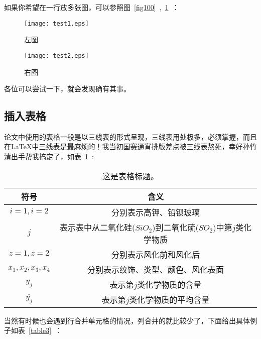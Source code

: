 如果你希望在一行放多张图，可以参照图~\ref{fig100}~,~\ref{fig101}~：
\begin{figure}[H]
	\centering
	\begin{minipage}[t]{0.48\textwidth}
		\centering
		\texttt{[image: test1.eps]}
		\caption{左图}
		\label{fig100}
	\end{minipage}
	\begin{minipage}[t]{0.48\textwidth}
		\centering
		\texttt{[image: test2.eps]}
		\caption{右图}
		\label{fig101}
	\end{minipage}
\end{figure}

各位可以尝试一下，就会发现确有其事。

\subsection{插入表格}



论文中使用的表格一般是以三线表的形式呈现，三线表用处极多，必须掌握，而且在\LaTeX 中三线表是最麻烦的！我当初国赛通宵排版差点被三线表熬死，幸好孙竹清出手帮我搞定了，如表~\ref{table10}~:

\begin{table}[H]
	\centering
		\caption{这是表格标题。}
		\begin{tabular}{c c}  %
			\toprule[1.5pt]   %
			符号 & 含义  \\ 
			\midrule[1pt]     %
			$i=1,i=2$ & 分别表示高钾、铅钡玻璃 \\ 
			$j$ & 表示表中从二氧化硅($SiO_2$)到二氧化硫($SO_2$)中第$j$类化学物质 \\
			$z=1,z=2$ & 分别表示风化前和风化后 \\
			$x_1,x_2,x_3,x_4$ & 分别表示纹饰、类型、颜色、风化表面 \\
			$y_j$ & 表示第$j$类化学物质的含量 \\ 
			$\overline{y_j}$ & 表示第$j$类化学物质的平均含量 \\  
			\toprule[1.5pt]   %
		\end{tabular}
		\label{table10}
\end{table}

当然有时候也会遇到行合并单元格的情况，列合并的就比较少了，下面给出具体例子如表~\ref{table3}~：

